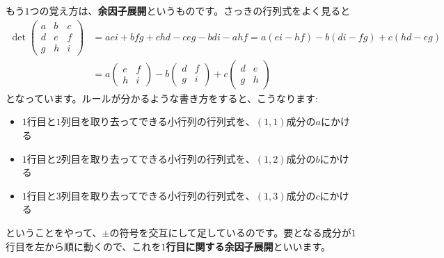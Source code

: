 \begin{figure}[h!tbp]
\centering
\end{figure}

もう$1$つの覚え方は、\textbf{余因子展開}というものです。さっきの行列式をよく見ると
\begin{align*}
\det
\begin{pmatrix}
a & b & c \\
d & e & f \\
g & h & i
\end{pmatrix}
&=  aei + bfg + chd - ceg - bdi - ahf
= a(ei - hf) - b(di - fg) + c(hd - eg) \\
&=
a
\begin{pmatrix}
e & f \\
h & i
\end{pmatrix}
- b
\begin{pmatrix}
d & f \\
g & i
\end{pmatrix}
+ c
\begin{pmatrix}
d & e \\
g & h
\end{pmatrix}
\end{align*}
となっています。ルールが分かるような書き方をすると、こうなります:
\begin{itemize}
\item \uline{$1$}行目と\uline{$1$}列目を取り去ってできる小行列の行列式を、\uline{$(1, 1)$}成分の$a$にかける
\item \uline{$1$}行目と\uline{$2$}列目を取り去ってできる小行列の行列式を、\uline{$(1, 2)$}成分の$b$にかける
\item \uline{$1$}行目と\uline{$3$}列目を取り去ってできる小行列の行列式を、\uline{$(1, 3)$}成分の$c$にかける
\end{itemize}
ということをやって、$\pm$の符号を交互にして足しているのです。要となる成分が$1$行目を左から順に動くので、これを\textbf{$1$行目に関する余因子展開}といいます。

